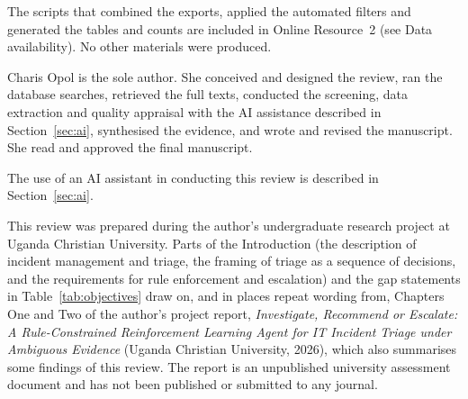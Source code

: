 \documentclass[pdflatex,sn-basic]{sn-jnl}
\begin{document}
The scripts that combined the exports, applied the automated filters and generated the tables and counts are included in Online Resource~2 (see Data availability). No other materials were produced.

Charis Opol is the sole author. She conceived and designed the review, ran the database searches, retrieved the full texts, conducted the screening, data extraction and quality appraisal with the AI assistance described in Section~\ref{sec:ai}, synthesised the evidence, and wrote and revised the manuscript. She read and approved the final manuscript.

The use of an AI assistant in conducting this review is described in Section~\ref{sec:ai}.

This review was prepared during the author's undergraduate research project at Uganda Christian University. Parts of the Introduction (the description of incident management and triage, the framing of triage as a sequence of decisions, and the requirements for rule enforcement and escalation) and the gap statements in Table~\ref{tab:objectives} draw on, and in places repeat wording from, Chapters One and Two of the author's project report, \emph{Investigate, Recommend or Escalate: A Rule-Constrained Reinforcement Learning Agent for IT Incident Triage under Ambiguous Evidence} (Uganda Christian University, 2026), which also summarises some findings of this review. The report is an unpublished university assessment document and has not been published or submitted to any journal.


\end{document}
